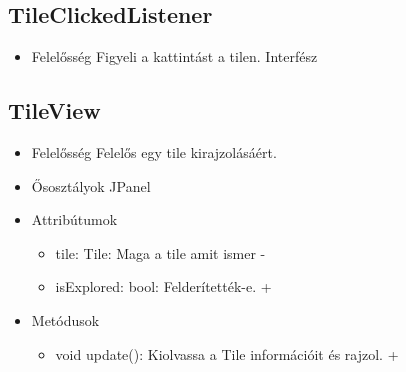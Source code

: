 \subsection{TileClickedListener}
\begin{itemize}
	\item Felelősség\newline
	Figyeli a kattintást a tilen. Interfész
\end{itemize}

\subsection{TileView}
\begin{itemize}
	\item Felelősség\newline
	Felelős egy tile kirajzolásáért.
	\item Ősosztályok\newline
	JPanel
	\item Attribútumok\newline
	\begin{itemize}
		\item tile: Tile: Maga a tile amit ismer -
		\item isExplored: bool: Felderítették-e. +
	\end{itemize}
	\item Metódusok\newline
	\begin{itemize}
		\item void update(): Kiolvassa a Tile információit és rajzol. +
	\end{itemize}
\end{itemize}

